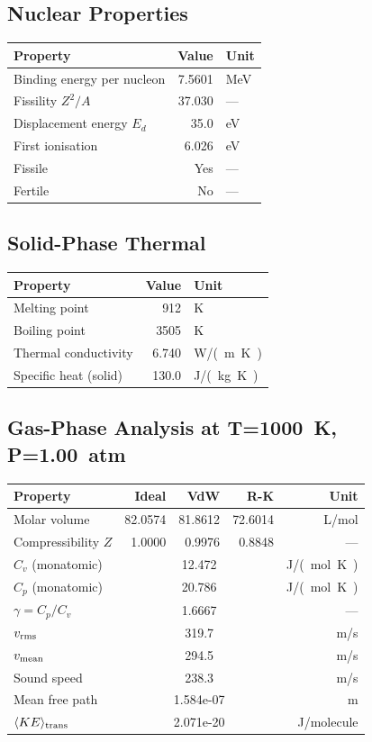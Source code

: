 \documentclass[11pt,a4paper]{article}
\begin{document}
\subsection{Nuclear Properties}
\begin{tabular}{lrl}
  \toprule
  Property & Value & Unit \\
  \midrule
  Binding energy per nucleon & 7.5601 & \si{MeV} \\
  Fissility $Z^2/A$ & 37.030 & --- \\
  Displacement energy $E_d$ & 35.0 & \si{eV} \\
  First ionisation & 6.026 & \si{eV} \\
  Fissile & Yes & --- \\
  Fertile & No & --- \\
  \bottomrule
\end{tabular}

\subsection{Solid-Phase Thermal}
\begin{tabular}{lrl}
  \toprule
  Property & Value & Unit \\
  \midrule
  Melting point & 912 & \si{K} \\
  Boiling point & 3505 & \si{K} \\
  Thermal conductivity & 6.740 & \si{W/(m.K)} \\
  Specific heat (solid) & 130.0 & \si{J/(kg.K)} \\
  \bottomrule
\end{tabular}

\subsection{Gas-Phase Analysis at T=\SI{1000}{K}, P=\SI{1.00}{atm}}
\begin{tabular}{lrrrr}
  \toprule
  Property & Ideal & VdW & R-K & Unit \\
  \midrule
  Molar volume & 82.0574 & 81.8612 & 72.6014 & \si{L/mol} \\
  Compressibility $Z$ & 1.0000 & 0.9976 & 0.8848 & --- \\
  \midrule
  $C_v$ (monatomic) & \multicolumn{3}{c}{12.472} & \si{J/(mol.K)} \\
  $C_p$ (monatomic) & \multicolumn{3}{c}{20.786} & \si{J/(mol.K)} \\
  $\gamma = C_p/C_v$ & \multicolumn{3}{c}{1.6667} & --- \\
  $v_{\rm rms}$ & \multicolumn{3}{c}{319.7} & \si{m/s} \\
  $v_{\rm mean}$ & \multicolumn{3}{c}{294.5} & \si{m/s} \\
  Sound speed & \multicolumn{3}{c}{238.3} & \si{m/s} \\
  Mean free path & \multicolumn{3}{c}{1.584e-07} & \si{m} \\
  $\langle KE \rangle_{\rm trans}$ & \multicolumn{3}{c}{2.071e-20} & \si{J/molecule} \\
  \bottomrule
\end{tabular}
\end{document}
